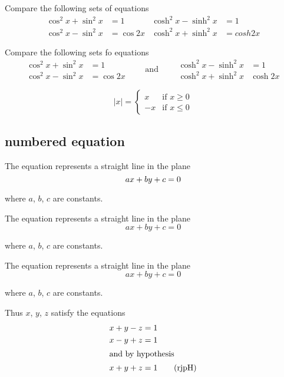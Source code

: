 \documentclass[a4paper, UTF8]{article}
\begin{document}
Compare the following sets of equations
\begin{align*}
    \cos^2x+\sin^2x & =1    & \cosh^2x-\sinh^2x & =1\\
    \cos^2x-\sin^2x & =\cos2x   & \cosh^2x+\sinh^2x &= cosh2x
\end{align*}

Compare the following sets fo equations
\begin{equation*}
    \begin{aligned}
        \cos^2x+\sin^2x & =1\\
        \cos^2x-\sin^2x & =\cos2x
    \end{aligned}
    \qquad\text{and}\qquad
    \begin{aligned}
        \cosh^2x-\sinh^2x & =1\\
        \cosh^2x+\sinh^2x & \cosh2x
    \end{aligned}
\end{equation*}

\begin{equation*}
    |x|=
    \begin{cases}
        x & \text{if $x\ge 0$}\\
        -x & \text{if $x\le 0$}
    \end{cases}
\end{equation*}
\newpage

\subsection{\large numbered equation}
The equation represents a straight line in the plane
\begin{equation}
    ax+by+c=0
    \numberwithin{equation}{section}
\end{equation} 

where $a$, $b$, $c$ are constants.

The equation represents a straight line in the plane
\begin{equation}
    ax+by+c=0
    \tag{rjp}
\end{equation} 

where $a$, $b$, $c$ are constants.

The equation represents a straight line in the plane
\begin{equation}
    ax+by+c=0
    \tag*{rjp}
\end{equation} 

where $a$, $b$, $c$ are constants.


Thus $x$, $y$, $z$ satisfy the equations
\begin{align*}
    x+y-z & =1\notag\\
    x-y+z & =1\notag\\
    \intertext{and by hypothesis}
    x+y+z & =1\tag{rjpH}
\end{align*}
\end{document}

